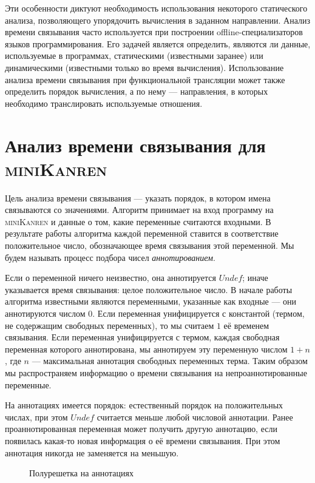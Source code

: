 \documentclass[conference,a4paper,american,russian]{IEEEtran}
\newcommand{\miniKanren}{\textsc{miniKanren}}
\begin{document}
Эти особенности диктуют необходимость использования некоторого статического анализа, позволяющего упорядочить вычисления в заданном направлении. 
Анализ времени связывания часто используется при построении offline-специализаторов языков программирования. 
Его задачей является определить, являются ли данные, используемые в программах, статическими (известными заранее) или динамическими (известными только во время вычисления).
Использование анализа времени связывания при функциональной трансляции может также определить порядок вычисления, а по нему --- направления, в которых необходимо транслировать используемые отношения. 

\section{Анализ времени связывания для \miniKanren{}}\label{bta}

Цель анализа времени связывания --- указать порядок, в котором имена связываются со значениями.
Алгоритм принимает на вход программу на \miniKanren{} и данные о том, какие переменные считаются входными. 
В результате работы алгоритма каждой переменной ставится в соответствие положительное число, обозначающее время связывания этой переменной.
Мы будем называть процесс подбора чисел \emph{аннотированием}.

Если о переменной ничего неизвестно, она аннотируется $Undef$; иначе указывается время связывания: целое положительное число.
В начале работы алгоритма известными являются переменными, указанные как входные --- они аннотируются числом $0$.
Если переменная унифицируется с константой (термом, не содержащим свободных переменных), то мы считаем $1$ её временем связывания. 
Если переменная унифицируется с термом, каждая свободная переменная которого аннотирована, мы аннотируем эту переменную числом $1+n$, где $n$ --- максимальная аннотация свободных переменных терма. 
Таким образом мы распространяем информацию о времени связывания на непроаннотированные переменные.

На аннотациях имеется порядок: естественный порядок на положительных числах, при этом $Undef$ считается меньше любой числовой аннотации.
Ранее проаннотированная переменная может получить другую аннотацию, если появилась какая-то новая информация о её времени связывания.
При этом аннотация никогда не заменяется на меньшую. 

\begin{figure}[htbp]
  \centering
  \caption{Полурешетка на аннотациях}
  \label{fig:image}
\end{figure}
\end{document}

